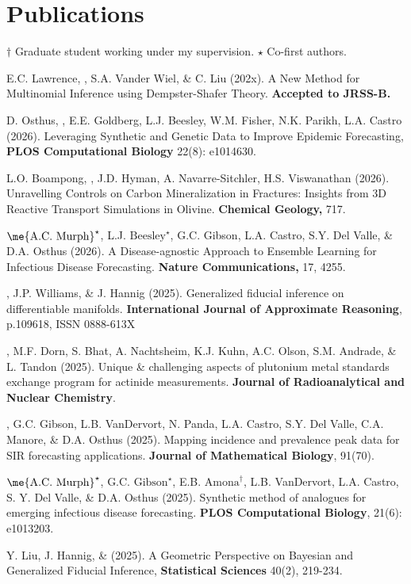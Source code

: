 \section{Publications}
$\dagger$ Graduate student working under my supervision. \quad $\star$ Co-first authors.
\begin{etaremune}
\item E.C. Lawrence, , S.A. Vander Wiel, \& C. Liu (202x). A New Method for Multinomial Inference using Dempster-Shafer Theory. \textbf{Accepted to JRSS-B.}
\item D. Osthus, , E.E. Goldberg, L.J. Beesley, W.M. Fisher, N.K. Parikh, L.A. Castro (2026). Leveraging Synthetic and Genetic Data to Improve Epidemic Forecasting, \textbf{PLOS Computational Biology} 22(8): e1014630. 
\item L.O. Boampong, , J.D. Hyman, A. Navarre-Sitchler, H.S. Viswanathan (2026). Unravelling Controls on Carbon Mineralization in Fractures: Insights from 3D Reactive Transport Simulations in Olivine. \textbf{Chemical Geology,} 717. 
\item $\text{\me{A.C. Murph}}^\star$, L.J. $\text{Beesley}^\star$, G.C. Gibson, L.A. Castro, S.Y. Del Valle, \& D.A. Osthus (2026). A Disease-agnostic Approach to Ensemble Learning for Infectious Disease Forecasting. \textbf{Nature Communications,} 17, 4255.
\item {}, J.P. Williams, \& J. Hannig (2025). Generalized fiducial inference on differentiable manifolds. \textbf{International Journal of Approximate Reasoning}, p.109618, ISSN 0888-613X 
\item {}, M.F. Dorn, S. Bhat, A. Nachtsheim, K.J. Kuhn, A.C. Olson, S.M. Andrade, \& L. Tandon (2025). Unique \& challenging aspects of plutonium metal standards exchange program for actinide measurements. \textbf{Journal of Radioanalytical and Nuclear Chemistry}. 
\item {}, G.C. Gibson, L.B. VanDervort, N. Panda, L.A. Castro, S.Y. Del Valle, C.A. Manore, \& D.A. Osthus (2025). Mapping incidence and prevalence peak data for SIR forecasting applications. \textbf{Journal of Mathematical Biology}, 91(70). 
\item $\text{\me{A.C. Murph}}^\star$, G.C. $\text{Gibson}^\star$, E.B. $\text{Amona}^\dagger$, L.B. VanDervort, L.A. Castro, S. Y. Del Valle, \& D.A. Osthus (2025). Synthetic method of analogues for emerging infectious disease forecasting. \textbf{PLOS Computational Biology}, 21(6): e1013203. 
\item Y. Liu, J. Hannig, \&  (2025). A Geometric Perspective on Bayesian and Generalized Fiducial Inference, \textbf{Statistical Sciences} 40(2), 219-234. 

\end{etaremune}
